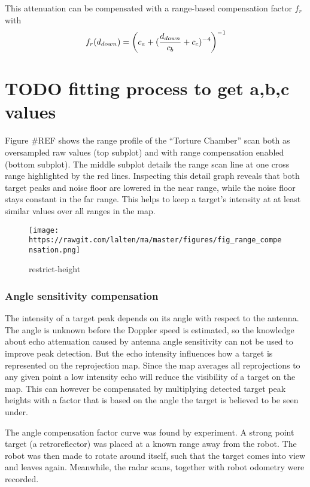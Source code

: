 This attenuation can be compensated with a range-based compensation
factor \(f_r\) with \[f_r(d_{down}) = {
\left(
c_a + (
{{d_{down}}\over{c_b}}
+ c_c)^{-4}
\right) ^ {-1}
}\]

\section{TODO fitting process to get a,b,c
values}\label{todo-fitting-process-to-get-abc-values}

Figure \#REF shows the range profile of the ``Torture Chamber'' scan
both as oversampled raw values (top subplot) and with range compensation
enabled (bottom subplot). The middle subplot details the range scan line
at one cross range highlighted by the red lines. Inspecting this detail
graph reveals that both target peaks and noise floor are lowered in the
near range, while the noise floor stays constant in the far range. This
helps to keep a target's intensity at at least similar values over all
ranges in the map.

\begin{figure}
\centering
\texttt{[image: https://rawgit.com/lalten/ma/master/figures/fig\_range\_compensation.png]}
\caption{restrict-height}
\end{figure}

\subsubsection{Angle sensitivity
compensation}\label{angle-sensitivity-compensation}

The intensity of a target peak depends on its angle with respect to the
antenna. The angle is unknown before the Doppler speed is estimated, so
the knowledge about echo attenuation caused by antenna angle sensitivity
can not be used to improve peak detection. But the echo intensity
influences how a target is represented on the reprojection map. Since
the map averages all reprojections to any given point a low intensity
echo will reduce the visibility of a target on the map. This can however
be compensated by multiplying detected target peak heights with a factor
that is based on the angle the target is believed to be seen under.

The angle compensation factor curve was found by experiment. A strong
point target (a retroreflector) was placed at a known range away from
the robot. The robot was then made to rotate around itself, such that
the target comes into view and leaves again. Meanwhile, the radar scans,
together with robot odometry were recorded.

